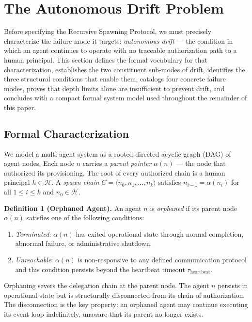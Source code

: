 \section{The Autonomous Drift Problem}
\label{sec:autonomous-drift}

Before specifying the Recursive Spawning Protocol, we must precisely characterize the failure mode it targets: \emph{autonomous drift} — the condition in which an agent continues to operate with no traceable authorization path to a human principal. This section defines the formal vocabulary for that characterization, establishes the two constituent sub-modes of drift, identifies the three structural conditions that enable them, catalogs four concrete failure modes, proves that depth limits alone are insufficient to prevent drift, and concludes with a compact formal system model used throughout the remainder of this paper.

\subsection{Formal Characterization}
\label{sec:drift-formal}

We model a multi-agent system as a rooted directed acyclic graph (DAG) of agent nodes. Each node $n$ carries a \emph{parent pointer} $\alpha(n)$ — the node that authorized its provisioning. The root of every authorized chain is a human principal $h \in \mathcal{H}$. A \emph{spawn chain} $C = \langle n_0, n_1, \ldots, n_k \rangle$ satisfies $n_{i-1} = \alpha(n_i)$ for all $1 \leq i \leq k$ and $n_0 \in \mathcal{H}$.

\medskip
\noindent\textbf{Definition 1 (Orphaned Agent).}
An agent $n$ is \emph{orphaned} if its parent node $\alpha(n)$ satisfies one of the following conditions:

\begin{enumerate}
  \item[(a)] \emph{Terminated}: $\alpha(n)$ has exited operational state through normal completion, abnormal failure, or administrative shutdown.
  \item[(b)] \emph{Unreachable}: $\alpha(n)$ is non-responsive to any defined communication protocol and this condition persists beyond the heartbeat timeout $\tau_{\mathrm{heartbeat}}$.
\end{enumerate}

Orphaning severs the delegation chain at the parent node. The agent $n$ persists in operational state but is structurally disconnected from its chain of authorization. The disconnection is the key property: an orphaned agent may continue executing its event loop indefinitely, unaware that its parent no longer exists.

